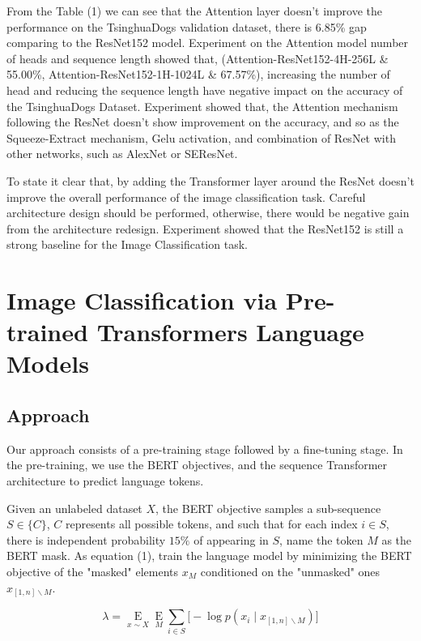 \documentclass[runningheads]{llncs}
\begin{document}
From the Table (1) we can see that the Attention layer doesn't improve the performance on the TsinghuaDogs validation dataset, there is 6.85\% gap comparing to the ResNet152 model.
Experiment on the Attention model number of heads and sequence length showed that, (Attention-ResNet152-4H-256L \&  	55.00\%, Attention-ResNet152-1H-1024L \&  	67.57\%),
increasing the number of head and reducing the sequence length have negative impact on the accuracy of the TsinghuaDogs Dataset.
Experiment showed that, the Attention mechanism following the ResNet doesn't show improvement on the accuracy, and so as the Squeeze-Extract mechanism, Gelu activation, and combination of ResNet with other networks, such as AlexNet or SEResNet.
\par To state it clear that, by adding the Transformer layer around the ResNet doesn't improve the overall performance of the image classification task.
Careful architecture design should be performed, otherwise, there would be negative gain from the architecture redesign.
Experiment showed that the ResNet152 is still a strong baseline for the Image Classification task.

\section{Image Classification via Pre-trained Transformers Language Models}

\subsection{Approach}

Our approach consists of a pre-training stage followed by a fine-tuning stage.
In the pre-training, we use the BERT objectives, and the sequence Transformer architecture to predict language tokens.

\par Given an unlabeled dataset $ X$, the BERT objective samples a sub-sequence $ S \in \{C\}$,
$C$ represents all possible tokens, and such that for each index $i \in  S$,
there is independent probability $15\%$ of appearing in $ S$,
name the token $M$ as the BERT mask.
As equation (1), train the language model by minimizing the BERT objective of the "masked" elements $x_M$
conditioned on the "unmasked" ones $x_{\left[1,n\right]\backslash M}$.

\begin{equation}
  \lambda = \mathop{ E}\limits_{x\sim X} \mathop{ E}\limits_{M} \sum_{i\in S}{\bigl[-\log{p(x_i\mid x_{\left[1,n \right]\backslash M})\bigr]}}
\end{equation}
\end{document}
